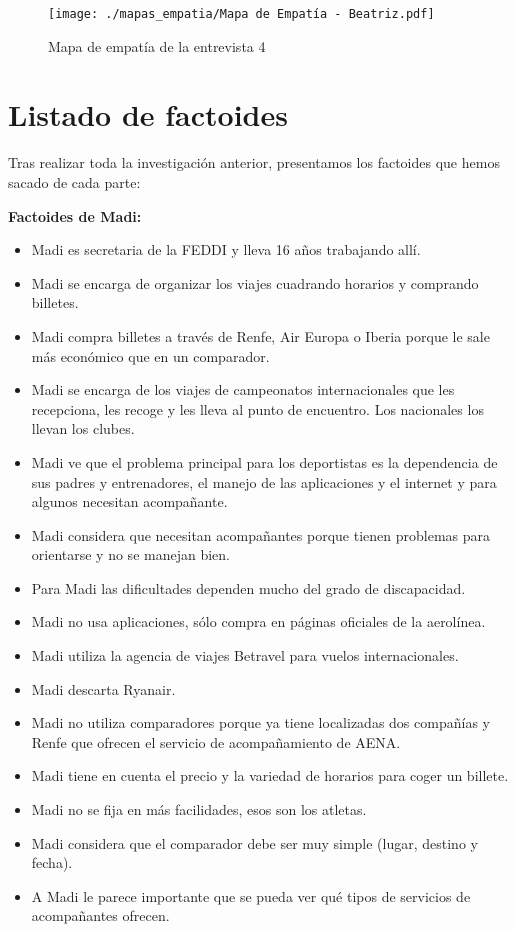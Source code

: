 \begin{figure}[H]
    \centering 
    \texttt{[image: ./mapas\_empatia/Mapa de Empatía - Beatriz.pdf]}
    \caption{Mapa de empatía de la entrevista 4}
    \label{fig:mapa_bea}
\end{figure}

\section{Listado de factoides}

Tras realizar toda la investigación anterior, presentamos los factoides que hemos sacado de cada parte:

\textbf{Factoides de Madi:}

\begin{itemize}
    \item Madi es secretaria de la FEDDI y lleva 16 años trabajando allí.
    \item Madi se encarga de organizar los viajes cuadrando horarios y comprando billetes.
    \item Madi compra billetes a través de Renfe, Air Europa o Iberia porque le sale más económico que en un comparador.
    \item Madi se encarga de los viajes de campeonatos internacionales que les recepciona, les recoge y les lleva al punto de encuentro. Los nacionales los llevan los clubes.
    \item Madi ve que el problema principal para los deportistas es la dependencia de sus padres y entrenadores, el manejo de las aplicaciones y el internet y para algunos necesitan acompañante.
    \item Madi considera que necesitan acompañantes porque tienen problemas para orientarse y no se manejan bien.
    \item Para Madi las dificultades dependen mucho del grado de discapacidad.
    \item Madi no usa aplicaciones, sólo compra en páginas oficiales de la aerolínea.
    \item Madi utiliza la agencia de viajes Betravel para vuelos internacionales.
    \item Madi descarta Ryanair.
    \item Madi no utiliza comparadores porque ya tiene localizadas dos compañías y Renfe que ofrecen el servicio de acompañamiento de AENA.
    \item Madi tiene en cuenta el precio y la variedad de horarios para coger un billete.
    \item Madi no se fija en más facilidades, esos son los atletas.
    \item Madi considera que el comparador debe ser muy simple (lugar, destino y fecha).
    \item A Madi le parece importante que se pueda ver qué tipos de servicios de acompañantes ofrecen.
\end{itemize}


